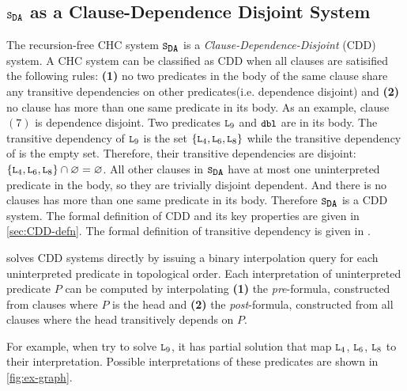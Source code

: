 \subsection{$\mcchc$ as a Clause-Dependence Disjoint System}
\label{sec:solve-ex}
The recursion-free CHC system $\mcchc$ is a
\emph{Clause-Dependence-Disjoint} (CDD) system.
A CHC system can be classified as CDD when all clauses are satisified
the following rules:
%
\textbf{(1)} no two predicates in the body of the same clause share any transitive
dependencies on other predicates(i.e. dependence disjoint) 
and \textbf{(2)} no clause has more than one same predicate in its body.
As an example, clause $(7)$ is dependence disjoint. 
%
Two predicates $\cc{L}_9$ and $\cc{dbl}$ are in its body.
%
The transitive dependency of $\cc{L}_9$ is the set
$\{\cc{L}_4,\cc{L}_6,\cc{L}_8\}$ while the transitive dependency of
 is the empty set.
%
Therefore, their transitive dependencies are disjoint:
$\{\cc{L}_4,\cc{L}_6,\cc{L}_8\} \cap \varnothing = \varnothing$.
%
All other clauses in $\mcchc$ have at most one uninterpreted predicate
in the body, so they are trivially disjoint dependent.
%
And there is no clauses has more than one same predicate in its body.
%
Therefore $\mcchc$ is a CDD system.
%
%
The formal definition of CDD and its key properties are given in
\autoref{sec:CDD-defn}.
The formal definition of transitive dependency is given in
.
%

\sys solves CDD systems directly by issuing a binary interpolation
query for each uninterpreted predicate in topological order.
%
Each interpretation of uninterpreted predicate $P$ can
be computed by interpolating
\textbf{(1)} the \emph{pre}-formula, constructed from clauses where
$P$ is the head and
\textbf{(2)} the \emph{post}-formula, constructed from
all clauses where the head transitively depends on $P$.
%

For example, when \sys try to solve $\cc{L}_9$, it has partial solution that 
map $\cc{L}_4$, $\cc{L}_6$, $\cc{L}_8$ to their interpretation.
%
Possible interpretations of these predicates are shown in
\autoref{fig:ex-graph}.
%



